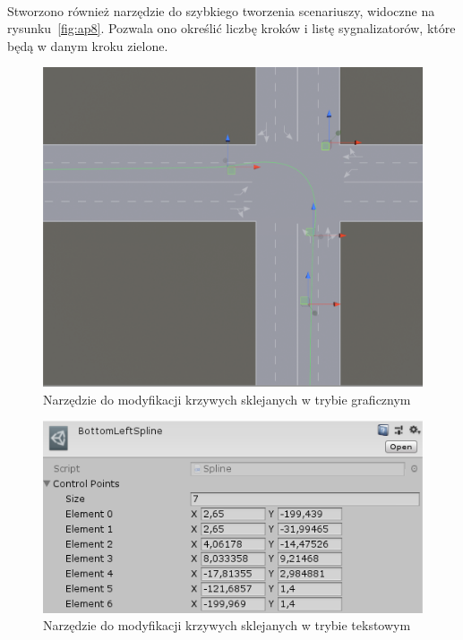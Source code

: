 \paragraph{}Stworzono również narzędzie do szybkiego tworzenia scenariuszy, widoczne na rysunku~\ref{fig:ap8}. Pozwala ono określić liczbę kroków i listę sygnalizatorów, które będą w danym kroku zielone.
\begin{figure}
	\centering
	\includegraphics[width=1\linewidth]{ap6}
	\caption[Narzędzie do modyfikacji krzywych sklejanych w trybie graficznym]{Narzędzie do modyfikacji krzywych sklejanych w trybie graficznym}
	\label{fig:ap6}
\end{figure}
\begin{figure}
	\centering
	\includegraphics[width=0.8\linewidth]{ap7}
	\caption[Narzędzie do modyfikacji krzywych sklejanych w trybie tekstowym]{Narzędzie do modyfikacji krzywych sklejanych w trybie tekstowym}
	\label{fig:ap7}
\end{figure}
